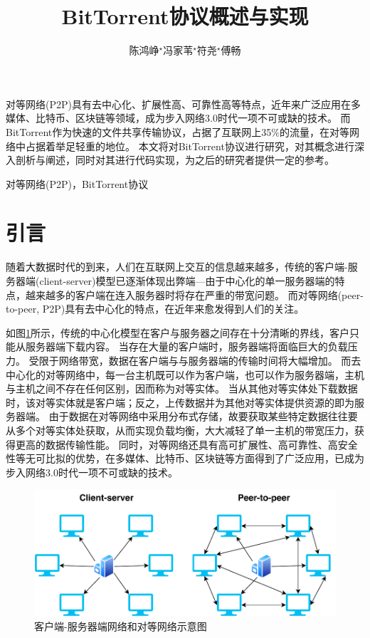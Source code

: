\documentclass[thesis]{thesis}
\title{BitTorrent协议概述与实现}
\author{陈鸿峥$^\star$\qquad 冯家苇$^\star$\qquad 符尧$^\star$\qquad 傅畅}
\begin{document}
	
	\maketitle
	
	\begin{abstractchinese}
		对等网络(P2P)具有去中心化、扩展性高、可靠性高等特点，近年来广泛应用在多媒体、比特币、区块链等领域，成为步入网络3.0时代一项不可或缺的技术。
		而BitTorrent作为快速的文件共享传输协议，占据了互联网上35\%的流量，在对等网络中占据着举足轻重的地位。
		本文将对BitTorrent协议进行研究，对其概念进行深入剖析与阐述，同时对其进行代码实现，为之后的研究者提供一定的参考。
	\end{abstractchinese}
	
	\begin{keywordchinese}
		对等网络(P2P)，BitTorrent协议
	\end{keywordchinese}
	
	
	\section{引言}
	随着大数据时代的到来，人们在互联网上交互的信息越来越多，传统的客户端-服务器端(client-server)模型已逐渐体现出弊端---由于中心化的单一服务器端的特点，越来越多的客户端在连入服务器时将存在严重的带宽问题。
	而对等网络(peer-to-peer, P2P)具有去中心化的特点，在近年来愈发得到人们的关注\cite{wiki_p2p}。
	
	如图\ref{fig:p2p}所示，传统的中心化模型在客户与服务器之间存在十分清晰的界线，客户只能从服务器端下载内容。
	当存在大量的客户端时，服务器端将面临巨大的负载压力。
	受限于网络带宽，数据在客户端与与服务器端的传输时间将大幅增加。
	而去中心化的对等网络中，每一台主机既可以作为客户端，也可以作为服务器端，主机与主机之间不存在任何区别，因而称为对等实体。
	当从其他对等实体处下载数据时，该对等实体就是客户端；反之，上传数据并为其他对等实体提供资源的即为服务器端。
	由于数据在对等网络中采用分布式存储，故要获取某些特定数据往往要从多个对等实体处获取，从而实现负载均衡，大大减轻了单一主机的带宽压力，获得更高的数据传输性能。
	同时，对等网络还具有高可扩展性、高可靠性、高安全性等无可比拟的优势，在多媒体\cite{qqlive}、比特币\cite{bitcoin}、区块链\cite{blockchain}等方面得到了广泛应用，已成为步入网络3.0时代一项不可或缺的技术\cite{web3}。
	\begin{figure}[htbp]
		\centering
		\includegraphics[width=0.6\linewidth]{fig/p2p.pdf}
		\caption{客户端-服务器端网络和对等网络示意图}
		\label{fig:p2p}
	\end{figure}
	
\end{document}

